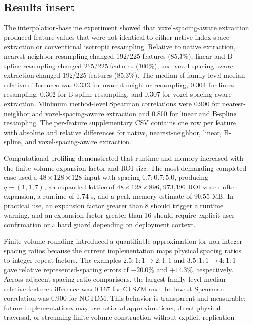 \subsection*{Results insert}
The interpolation-baseline experiment showed that voxel-spacing-aware extraction produced feature values that were not identical to either native index-space extraction or conventional isotropic resampling. Relative to native extraction, nearest-neighbor resampling changed 192/225 features (85.3\%), linear and B-spline resampling changed 225/225 features (100\%), and voxel-spacing-aware extraction changed 192/225 features (85.3\%). The median of family-level median relative differences was 0.333 for nearest-neighbor resampling, 0.304 for linear resampling, 0.302 for B-spline resampling, and 0.307 for voxel-spacing-aware extraction. Minimum method-level Spearman correlations were 0.900 for nearest-neighbor and voxel-spacing-aware extraction and 0.800 for linear and B-spline resampling. The per-feature supplementary CSV contains one row per feature with absolute and relative differences for native, nearest-neighbor, linear, B-spline, and voxel-spacing-aware extraction.

Computational profiling demonstrated that runtime and memory increased with the finite-volume expansion factor and ROI size. The most demanding completed case used a $48\times128\times128$ input with spacing $0.7{:}0.7{:}5.0$, producing $q=(1,1,7)$, an expanded lattice of $48\times128\times896$, 973,196 ROI voxels after expansion, a runtime of 1.74 s, and a peak memory estimate of 90.55 MB. In practical use, an expansion factor greater than 8 should trigger a runtime warning, and an expansion factor greater than 16 should require explicit user confirmation or a hard guard depending on deployment context.

Finite-volume rounding introduced a quantifiable approximation for non-integer spacing ratios because the current implementation maps physical spacing ratios to integer repeat factors. The examples $2.5{:}1{:}1\rightarrow2{:}1{:}1$ and $3.5{:}1{:}1\rightarrow4{:}1{:}1$ gave relative represented-spacing errors of $-20.0\%$ and $+14.3\%$, respectively. Across adjacent spacing-ratio comparisons, the largest family-level median relative feature difference was 0.167 for GLSZM and the lowest Spearman correlation was 0.900 for NGTDM. This behavior is transparent and measurable; future implementations may use rational approximations, direct physical traversal, or streaming finite-volume construction without explicit replication.

